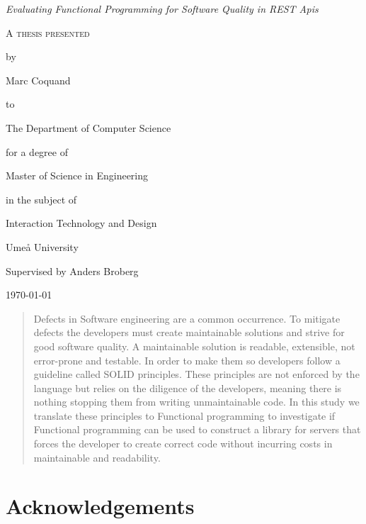 \documentclass[12pt]{report}
\theoremstyle{definition}
\theoremstyle{theorem}
\begin{document}
\begin{titlepage}
	\centering
    \null
    \vfill
    {\Large\itshape Evaluating Functional Programming for Software Quality in
    REST Apis    \par}
    \vspace{3.0cm}
	{\scshape 
    A thesis presented \par 
    by\par
	Marc Coquand\par
	to\par
    The Department of Computer Science\par
    \vspace{0.8cm}
	for a degree of\par
    Master of Science in Engineering\par
    in the subject of\par
    Interaction Technology and Design\par}
    \vfill
    Umeå University\par
    Supervised by Anders Broberg\par
	\today\par
\end{titlepage}
\clearpage
\thispagestyle{empty}

\clearpage\newpage
\thispagestyle{empty}

\begin{abstract} 
    Defects in Software engineering are a common occurrence. To mitigate defects
    the developers must create maintainable solutions and strive for good
    software quality. A maintainable solution is readable, extensible, not
    error-prone and testable. In order to make them so developers follow a
    guideline called SOLID principles. These principles are not enforced by the
    language but relies on the diligence of the developers, meaning there is
    nothing stopping them from writing unmaintainable code. In this study we
    translate these principles to Functional programming to investigate if
    Functional programming can be used to construct a library for servers that
    forces the developer to create correct code without incurring costs in
    maintainable and readability.
\end{abstract}

\clearpage\newpage
\thispagestyle{empty}

\section*{Acknowledgements}
\end{document}
